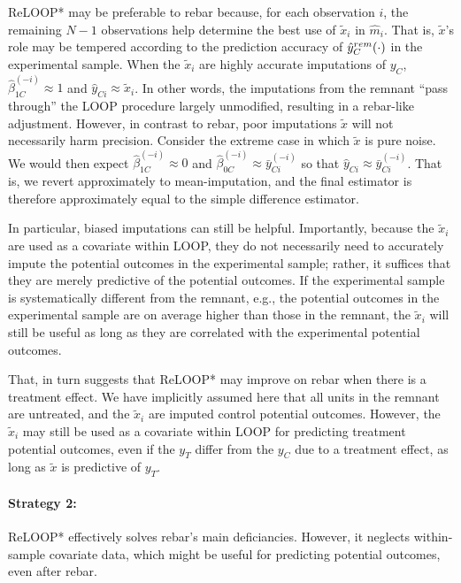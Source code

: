 ReLOOP* may be preferable to rebar because, for each
observation $i$, the remaining $N-1$ observations help determine the
best use of $\tilde{x}_i$ in $\hat{m}_i$.
That is, $\tilde{x}$'s role may be tempered
according to the prediction accuracy of $\hat{y}_C^{rem}(\cdot)$ in the
experimental sample.
When the $\tilde{x}_{i}$ are highly accurate imputations of $y_C$, $\hat{\beta}_{1C}^{(-i)} \approx 1$
and $\hat{y}_{Ci} \approx \tilde{x}_{i}$.  In other words, the
imputations from the remnant ``pass through'' the LOOP procedure
largely unmodified, resulting in a rebar-like adjustment.  However, in
contrast to rebar, poor imputations $\tilde{x}$ will not necessarily
harm precision.  Consider the extreme case in which $\tilde{x}$ is
pure noise.  We would then expect $\hat{\beta}_{1C}^{(-i)} \approx 0$
and $\hat{\beta}_{0C}^{(-i)} \approx \bar{y}^{(-i)}_{Ci}$ so that
$\hat{y}_{Ci} \approx \bar{y}^{(-i)}_{Ci}$.  That is, we revert
approximately to mean-imputation, and the final estimator is therefore
approximately equal to the simple difference estimator.

In particular, biased imputations can still be helpful.  Importantly,
because the $\tilde{x}_{i}$ are used as a covariate within LOOP, they
do not necessarily need to accurately impute the potential outcomes in
the experimental sample; rather, it suffices that they are merely
predictive of the potential outcomes.  If the experimental sample is
systematically different from the remnant,  e.g., the potential
outcomes in the experimental sample are on average higher than those
in the remnant, the $\tilde{x}_{i}$ will still be useful as long as
they are correlated with the experimental potential outcomes.

That, in turn suggests that ReLOOP* may improve on rebar when there is a treatment
effect.
We have implicitly assumed here that all units in the remnant are
untreated, and the $\tilde{x}_{i}$ are imputed control potential
outcomes.
However, the $\tilde{x}_{i}$ may still be used as a covariate within
LOOP for predicting treatment potential outcomes, even if the $y_T$
differ from the $y_C$ due to a treatment effect, as long as
$\tilde{x}$ is predictive of $y_T$.




\paragraph{Strategy 2:}
ReLOOP* effectively solves rebar's main deficiancies.
However, it neglects within-sample covariate data, which might be
useful for predicting potential outcomes, even after rebar.


